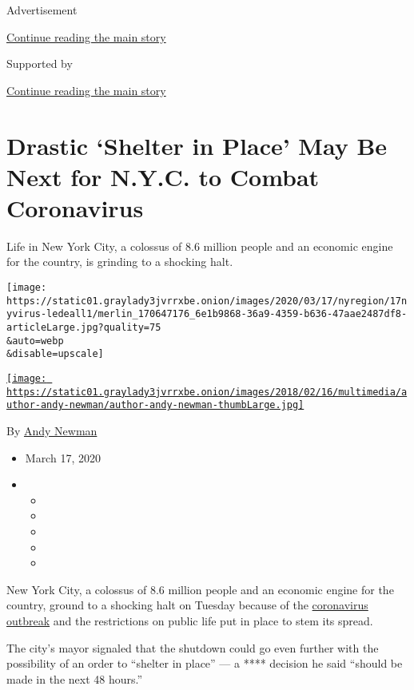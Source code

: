 Advertisement

\protect\hyperlink{after-top}{Continue reading the main story}

Supported by

\protect\hyperlink{after-sponsor}{Continue reading the main story}

\hypertarget{drastic-shelter-in-place-may-be-next-for-nyc-to-combat-coronavirus}{%
\section{Drastic `Shelter in Place' May Be Next for N.Y.C. to Combat
Coronavirus}\label{drastic-shelter-in-place-may-be-next-for-nyc-to-combat-coronavirus}}

Life in New York City, a colossus of 8.6 million people and an economic
engine for the country, is grinding to a shocking halt.

\texttt{[image: https://static01.graylady3jvrrxbe.onion/images/2020/03/17/nyregion/17nyvirus-ledeall1/merlin\_170647176\_6e1b9868-36a9-4359-b636-47aae2487df8-articleLarge.jpg?quality=75\\\&auto=webp\\\&disable=upscale]}

\href{https://www.nytimes3xbfgragh.onion/by/andy-newman}{\texttt{[image: https://static01.graylady3jvrrxbe.onion/images/2018/02/16/multimedia/author-andy-newman/author-andy-newman-thumbLarge.jpg]}}

By \href{https://www.nytimes3xbfgragh.onion/by/andy-newman}{Andy Newman}

\begin{itemize}
\item
  March 17, 2020
\item
  \begin{itemize}
  \item
  \item
  \item
  \item
  \item
  \end{itemize}
\end{itemize}

New York City, a colossus of 8.6 million people and an economic engine
for the country, ground to a shocking halt on Tuesday because of the
\href{https://www.nytimes3xbfgragh.onion/2020/03/18/podcasts/the-daily/cuomo-new-york-coronavirus.html?action=click\&module=Briefings\&pgtype=Homepage}{coronavirus
outbreak} and the restrictions on public life put in place to stem its
spread.

The city's mayor signaled that the shutdown could go even further with
the possibility of an order to ``shelter in place'' --- a **** decision
he said ``should be made in the next 48 hours.''

